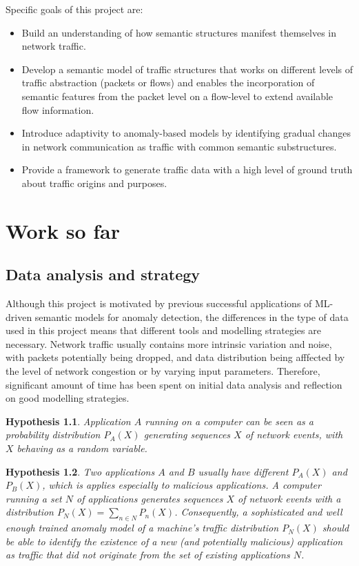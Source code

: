 \documentclass[a4paper,12pt,twoside]{report}
\newtheorem{hypothesis}{Hypothesis}
\begin{document}
Specific goals of this project are:
\begin{itemize}
\item Build an understanding of how semantic structures manifest themselves in network traffic.
\item Develop a semantic model of traffic structures that works on different levels of traffic abstraction (packets or flows) and enables the incorporation of semantic features from the packet level on a flow-level to extend available flow information.
\item Introduce adaptivity to anomaly-based models by identifying gradual changes in network communication as traffic with common semantic substructures.
\item Provide a framework to generate traffic data with a high level of ground truth about traffic origins and purposes.
\end{itemize}



\chapter{Work so far}\label{Sofar}



\section{Data analysis and strategy}

Although this project is motivated by previous successful applications of ML-driven semantic models for anomaly detection, the differences in the type of data used in this project means that different tools and modelling strategies are necessary. Network traffic usually contains more intrinsic variation and noise, with packets potentially being dropped, and data distribution being afffected by the level of network congestion or by varying input parameters. Therefore, significant amount of time has been spent on initial data analysis and reflection on good modelling strategies. 


\begin{hypothesis}\label{Ass1}
Application $A$ running on a computer can be seen as a probability distribution $P_A(X)$ generating sequences $X$ of network events, with $X$ behaving as a random variable.
\end{hypothesis}

\begin{hypothesis}\label{Ass2}
Two applications $A$ and $B$ usually have different $P_A(X)$ and $P_B(X)$, which is applies especially to malicious applications. A computer running a set $N$ of applications %
generates sequences $X$ of network events with a distribution $P_N(X)=\sum_{n\in N}P_n(X)$. Consequently, a sophisticated and well enough trained anomaly model of a machine's traffic distribution $P_N(X)$ should be able to identify the existence of a new (and potentially malicious) application as traffic that did not originate from the set of existing applications $N$.
\end{hypothesis}
\end{document}
